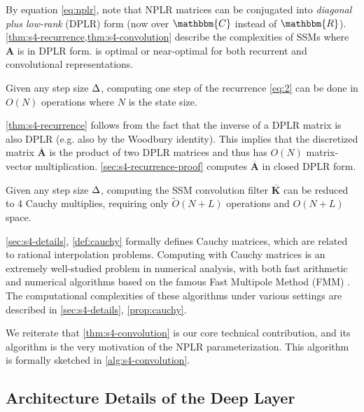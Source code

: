 By equation \eqref{eq:nplr}, note that NPLR matrices can be conjugated into \emph{diagonal plus low-rank} (DPLR) form
(now over \( \mathbbm{C} \) instead of \( \mathbbm{R} \)).
\cref{thm:s4-recurrence,thm:s4-convolution} describe the complexities of SSMs where \( \bm{A} \) is in DPLR form.
\methodabbrv{} is optimal or near-optimal for both recurrent and convolutional representations.


\begin{theorem}%
  \label{thm:s4-recurrence}
  Given any step size \( \Delta \), computing one step of the recurrence \eqref{eq:2} can be done in \( O(N) \) operations where \( N \) is the state size.
\end{theorem}

\cref{thm:s4-recurrence} follows from the fact that the inverse of a DPLR matrix is also DPLR (e.g. also by the Woodbury identity).
This implies that the discretized matrix \( \bm{\overline{A}} \) is the product of two DPLR matrices and thus has \( O(N) \) matrix-vector multiplication.
\cref{sec:s4-recurrence-proof} computes \( \bm{\overline{A}} \) in closed DPLR form.
\begin{theorem}%
  \label{thm:s4-convolution}
  Given any step size \( \Delta \), computing the SSM convolution filter \( \bm{\overline{K}} \) can be reduced to 4 Cauchy multiplies,
  requiring only
  \( \widetilde{O}(N+L) \) operations and \( O(N+L) \) space.
\end{theorem}


\cref{sec:s4-details}, \cref{def:cauchy} formally defines Cauchy matrices, which are related to rational interpolation problems.
Computing with Cauchy matrices is an extremely well-studied problem in numerical analysis,
with both fast arithmetic and numerical algorithms based on the famous Fast Multipole Method (FMM)
\citep{pan2001structured,pan2015transformations,pan2017fast}.
The computational complexities of these algorithms under various settings are described in \cref{sec:s4-details}, \cref{prop:cauchy}.

We reiterate that \cref{thm:s4-convolution} is our core technical contribution,
and its algorithm is the very motivation of the NPLR \methodabbrv{} parameterization.
This algorithm is formally sketched in \cref{alg:s4-convolution}.


\subsection{Architecture Details of the Deep \methodabbrv{} Layer}
\label{sec:s4-architecture}

